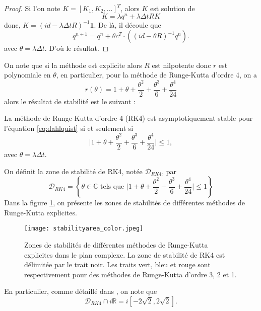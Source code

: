 \begin{proof}
Si l'on note $K = [K_1, K_2, ...]^T$, alors $K$ est solution de 
\begin{equation}
K = \lambda q^n +  \lambda \Delta t R K
\end{equation}
donc, $K = (id - \lambda \Delta t R)^{-1} \mathbf{1}$.
De là, il découle que 
\begin{equation}
q^{n+1} = q^n + \theta c^T \cdot \left( (id - \theta R)^{-1} q^n \right).
\end{equation} 
avec $\theta = \lambda \Delta t$. D'où le résultat.
\end{proof}
On note que si la méthode est explicite alors $R$ est nilpotente donc $r$ est polynomiale en $\theta$, 
en particulier, pour la méthode de Runge-Kutta d'ordre 4, on a 
\begin{equation}
r(\theta) = 1 + \theta + \dfrac{\theta^2}{2} + \dfrac{\theta^3}{6} + \dfrac{\theta^4}{24} 
\end{equation}
alors le résultat de stabilité est le suivant :
\begin{proposition}
La méthode de Runge-Kutta d'ordre 4 (RK4) est asymptotiquement stable pour l'équation \eqref{eq:dahlquist} si et seulement si
\begin{equation}
\vert 1 + \theta + \dfrac{\theta^2}{2} + \dfrac{\theta^3}{6} + \dfrac{\theta^4}{24}  \vert \leq 1,
\end{equation}
avec $\theta = \lambda \Delta t$.
\label{prop:stab_rk4}
\end{proposition}
On définit la zone de stabilité de RK4, notée $\mathcal{D}_{RK4}$, par
\begin{equation}
\mathcal{D}_{RK4} = \left\lbrace \theta \in \mathbb{C} \text{ tels que } \vert 1 + \theta + \dfrac{\theta^2}{2} + \dfrac{\theta^3}{6} + \dfrac{\theta^4}{24}  \vert \leq 1 \right\rbrace
\end{equation} 
Dans la figure \ref{fig:stab_area}, on présente les zones de stabilités de différentes méthodes de Runge-Kutta explicites.
\begin{figure}[htbp]
\begin{center}
\texttt{[image: stabilityarea\_color.jpeg]}
\end{center}
\caption{Zones de stabilités de différentes méthodes de Runge-Kutta explicites dans le plan complexe. La zone de stabilité de RK4 est délimitée par le trait noir. Les traits vert, bleu et rouge sont respectivement pour des méthodes de Runge-Kutta d'ordre 3, 2 et 1.}
\label{fig:stab_area}
\end{figure}
En particulier, comme détaillé dans \cite{Hundsdorfer2013}, on note que
\begin{equation}
\mathcal{D}_{RK4} \cap i \mathbb{R} = i \left[-2 \sqrt{2},2 \sqrt{2}\right].
\end{equation}

